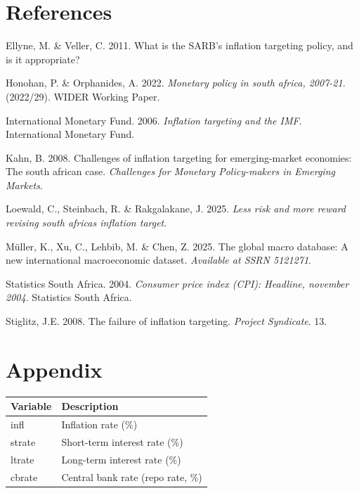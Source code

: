 \documentclass[11pt,preprint]{elsarticle}
\let\origtable\table
\let\endorigtable\endtable
\renewenvironment{table}[1][2] {
    \expandafter\origtable\expandafter[H]
} {
    \endorigtable
}
\numberwithin{equation}{section}
\numberwithin{figure}{section}
\numberwithin{table}{section}
\newlength{\cslhangindent}
\newenvironment{CSLReferences}[2] %
{\begin{list}{}{%
	\setlength{\itemindent}{0pt}
	\setlength{\leftmargin}{0pt}
	\setlength{\parsep}{0pt}
	\ifodd #1
	\setlength{\leftmargin}{\cslhangindent}
	\setlength{\itemindent}{-1\cslhangindent}
	\fi
	\setlength{\itemsep}{#2\baselineskip}}}
{\end{list}}
\begin{document}
\section*{References}\label{references}

\label{refs}
\begin{CSLReferences}{1}{1}
Ellyne, M. \& Veller, C. 2011. What is the SARB's inflation targeting
policy, and is it appropriate?

Honohan, P. \& Orphanides, A. 2022. \emph{Monetary policy in south
africa, 2007-21}. (2022/29). WIDER Working Paper.

International Monetary Fund. 2006. \emph{Inflation targeting and the
{IMF}}. International Monetary Fund.

Kahn, B. 2008. Challenges of inflation targeting for emerging-market
economies: The south african case. \emph{Challenges for Monetary
Policy-makers in Emerging Markets}.

Loewald, C., Steinbach, R. \& Rakgalakane, J. 2025. \emph{Less risk and
more reward revising south africas inflation target}.

Müller, K., Xu, C., Lehbib, M. \& Chen, Z. 2025. The global macro
database: A new international macroeconomic dataset. \emph{Available at
SSRN 5121271}.

Statistics South Africa. 2004. \emph{Consumer price index (CPI):
Headline, november 2004}. Statistics South Africa.

Stiglitz, J.E. 2008. The failure of inflation targeting. \emph{Project
Syndicate}. 13.

\end{CSLReferences}

\newpage

\section*{Appendix}\label{appendix}

\begin{table}[H]
\centering
\begin{tabular}{ll}
  \hline
Variable & Description \\ 
  \hline
infl & Inflation rate (\%) \\ 
  strate & Short-term interest rate (\%) \\ 
  ltrate & Long-term interest rate (\%) \\ 
  cbrate & Central bank rate (repo rate, \%) \\ 
   \hline
\end{tabular}
\caption{Variable Descriptions\label{tab21}} 
\end{table}
\end{document}

